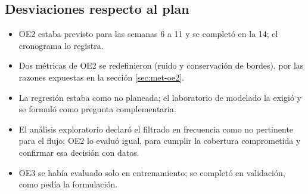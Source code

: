 \subsection{Desviaciones respecto al plan}

\begin{itemize}
    \item OE2 estaba previsto para las semanas 6 a 11 y se completó en la 14; el
    cronograma lo registra.
    \item Dos métricas de OE2 se redefinieron (ruido y conservación de bordes), por
    las razones expuestas en la sección \ref{sec:met-oe2}.
    \item La regresión estaba como no planeada; el laboratorio de modelado la exigió
    y se formuló como pregunta complementaria.
    \item El análisis exploratorio declaró el filtrado en frecuencia como no
    pertinente para el flujo; OE2 lo evaluó igual, para cumplir la cobertura
    comprometida y confirmar esa decisión con datos.
    \item OE3 se había evaluado solo en entrenamiento; se completó en validación,
    como pedía la formulación.
\end{itemize}
